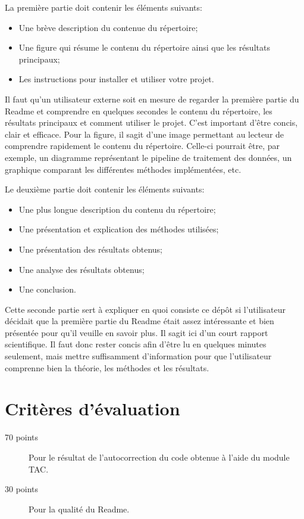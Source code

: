 \documentclass[12pt, letterpaper]{article}
\numberwithin{table}{section}
\numberwithin{figure}{section}
\numberwithin{equation}{section}
\begin{document}
\bigskip

\noindent La première partie doit contenir les éléments suivants:
\begin{itemize}
    \item Une brève description du contenue du répertoire;
    \item Une figure qui résume le contenu du répertoire ainsi que les résultats principaux;
    \item Les instructions pour installer et utiliser votre projet.
\end{itemize}
Il faut qu'un utilisateur externe soit en mesure de regarder la première partie du Readme et comprendre en quelques
secondes le contenu du répertoire, les résultats principaux et comment utiliser le projet.
C'est important d'être concis, clair et efficace.
Pour la figure, il sagit d'une image permettant au lecteur de comprendre rapidement le contenu du répertoire.
Celle-ci pourrait être, par exemple, un diagramme représentant le pipeline de traitement des données, un graphique
comparant les différentes méthodes implémentées, etc.

\bigskip

\noindent Le deuxième partie doit contenir les éléments suivants:
\begin{itemize}
    \item Une plus longue description du contenu du répertoire;
    \item Une présentation et explication des méthodes utilisées;
    \item Une présentation des résultats obtenus;
    \item Une analyse des résultats obtenus;
    \item Une conclusion.
\end{itemize}
Cette seconde partie sert à expliquer en quoi consiste ce dépôt si l'utilisateur décidait que la première partie
du Readme était assez intéressante et bien présentée pour qu'il veuille en savoir plus.
Il sagit ici d'un court rapport scientifique.
Il faut donc rester concis afin d'être lu en quelques minutes seulement, mais mettre suffisamment d'information pour
que l'utilisateur comprenne bien la théorie, les méthodes et les résultats.



\section{Critères d'évaluation}\label{sec:criteres-d'evaluation}

\begin{description}
  \item[70 points] Pour le résultat de l'autocorrection du code obtenue à l'aide du module TAC\@.
  \item[30 points] Pour la qualité du Readme.
\end{description}


\newpage
\printbibliography
\end{document}
